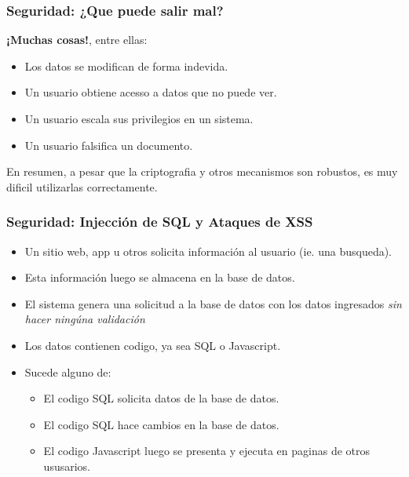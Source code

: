 \documentclass{beamer}
\begin{document}
\begin{frame}
    \frametitle{Seguridad: ¿Que puede salir mal?}
    {\bf ¡Muchas cosas!}, entre ellas:
    \begin{itemize}
        \item{Los datos se modifican de forma indevida.}
        \item{Un usuario obtiene acesso a datos que no puede ver.}
        \item{Un usuario escala sus privilegios en un sistema.}
        \item{Un usuario falsifica un documento.}
    \end{itemize}
    En resumen, a pesar que la criptografia y otros mecanismos son robustos,
    es muy dificil utilizarlas correctamente.
\end{frame}

\begin{frame}
    \frametitle{Seguridad: Injecci\'on de SQL y Ataques de XSS}
    \begin{itemize}
        \item{Un sitio web, app u otros solicita informaci\'on al usuario (ie. una busqueda).}
        \item{Esta informaci\'on luego se almacena en la base de datos.}
        \item{El sistema genera una solicitud a la base de datos con los datos ingresados
        \emph{sin hacer ning\'una validaci\'on}}
        \item{Los datos contienen codigo, ya sea SQL o Javascript.}
        \item{Sucede alguno de:
            \begin{itemize}
                \item{El codigo SQL solicita datos de la base de datos.}
                \item{El codigo SQL hace cambios en la base de datos.}
                \item{El codigo Javascript luego se presenta y ejecuta en paginas de otros ususarios.}
            \end{itemize}
        }
    \end{itemize}
\end{frame}
\end{document}

